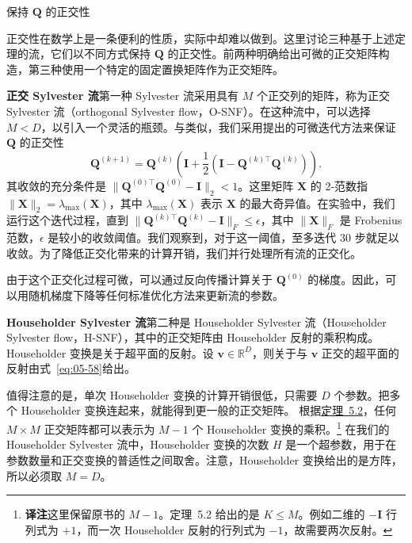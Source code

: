 \medskip\noindent 保持 $\mathbf{Q}$ 的正交性\par\smallskip
正交性在数学上是一条便利的性质，实际中却难以做到。这里讨论三种基于上述定理的流，它们以不同方式保持 $\mathbf{Q}$ 的正交性。前两种明确给出可微的正交矩阵构造，第三种使用一个特定的固定置换矩阵作为正交矩阵。

\textbf{正交 Sylvester 流}\quad 第一种 Sylvester 流采用具有 $M$ 个正交列的矩阵，称为正交 Sylvester 流（orthogonal Sylvester flow，O-SNF）。在这种流中，可以选择 $M<D$，以引入一个灵活的瓶颈。与类似，我们采用提出的可微迭代方法来保证 $\mathbf{Q}$ 的正交性
\begin{equation}
\mathbf{Q}^{(k+1)}=\mathbf{Q}^{(k)}
  \left(\mathbf{I}+\frac12\left(\mathbf{I}-\mathbf{Q}^{(k)\top}\mathbf{Q}^{(k)}\right)\right).
\tag{5.65}\label{eq:05-65}
\end{equation}
其收敛的充分条件是 $\|\mathbf{Q}^{(0)\top}\mathbf{Q}^{(0)}-\mathbf{I}\|_2<1$。这里矩阵 $\mathbf{X}$ 的 2-范数指 $\|\mathbf{X}\|_2=\lambda_{\max}(\mathbf{X})$，其中 $\lambda_{\max}(\mathbf{X})$ 表示 $\mathbf{X}$ 的最大奇异值。在实验中，我们运行这个迭代过程，直到 $\|\mathbf{Q}^{(k)\top}\mathbf{Q}^{(k)}-\mathbf{I}\|_F\leq\epsilon$，其中 $\|\mathbf{X}\|_F$ 是 Frobenius 范数，$\epsilon$ 是较小的收敛阈值。我们观察到，对于这一阈值，至多迭代 30 步就足以收敛。为了降低正交化带来的计算开销，我们并行处理所有流的正交化。

由于这个正交化过程可微，可以通过反向传播计算关于 $\mathbf{Q}^{(0)}$ 的梯度。因此，可以用随机梯度下降等任何标准优化方法来更新流的参数。

\textbf{Householder Sylvester 流}\quad 第二种是 Householder Sylvester 流（Householder Sylvester flow，H-SNF），其中的正交矩阵由 Householder 反射的乘积构成。Householder 变换是关于超平面的反射。设 $\mathbf{v}\in\mathbb{R}^D$，则关于与 $\mathbf{v}$ 正交的超平面的反射由式~\eqref{eq:05-58}给出。

值得注意的是，单次 Householder 变换的计算开销很低，只需要 $D$ 个参数。把多个 Householder 变换连起来，就能得到更一般的正交矩阵。
根据\hyperlink{thm:05-02}{定理~5.2}，任何 $M\times M$ 正交矩阵都可以表示为 $M-1$ 个 Householder 变换的乘积。\footnote{\textbf{译注}\quad 这里保留原书的 $M-1$。定理~5.2 给出的是 $K\leq M$。例如二维的 $-\mathbf{I}$ 行列式为 $+1$，而一次 Householder 反射的行列式为 $-1$，故需要两次反射。} 在我们的 Householder Sylvester 流中，Householder 变换的次数 $H$ 是一个超参数，用于在参数数量和正交变换的普适性之间取舍。注意，Householder 变换给出的是方阵，所以必须取 $M=D$。

